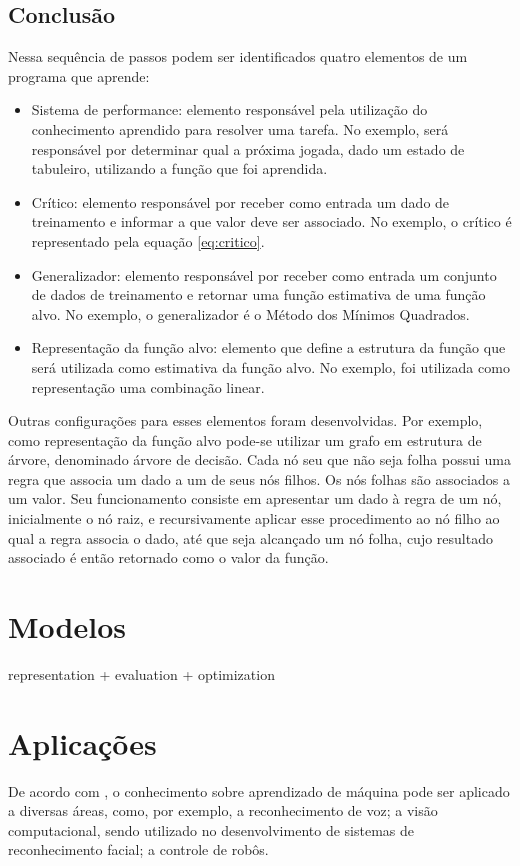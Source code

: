
\subsection*{Conclusão}

Nessa sequência de passos podem ser identificados quatro elementos de um programa que aprende:

\begin{itemize}
\item Sistema de performance: elemento responsável pela utilização do conhecimento aprendido para resolver uma tarefa. No exemplo, será responsável por determinar qual a próxima jogada, dado um estado de tabuleiro, utilizando a função que foi aprendida. 
\item Crítico: elemento responsável por receber como entrada um dado de treinamento e informar a que valor deve ser associado. No exemplo, o crítico é representado pela equação \ref{eq:critico}.
\item Generalizador: elemento responsável por receber como entrada um conjunto de dados de treinamento e retornar uma função estimativa de uma função alvo. No exemplo, o generalizador é o Método dos Mínimos Quadrados.
\item Representação da função alvo: elemento que define a estrutura da função que será utilizada como estimativa da função alvo. No exemplo, foi utilizada como representação uma combinação linear.
\end{itemize}

Outras configurações para esses elementos foram desenvolvidas. Por exemplo, como representação da função alvo pode-se utilizar um grafo em estrutura de árvore, denominado árvore de decisão. Cada nó seu que não seja folha possui uma regra que associa um dado a um de seus nós filhos. Os nós folhas são associados a um valor. Seu funcionamento consiste em apresentar um dado à regra de um nó, inicialmente o nó raiz, e recursivamente aplicar esse procedimento ao nó filho ao qual a regra associa o dado, até que seja alcançado um nó folha, cujo resultado associado é então retornado como o valor da função.

\section{Modelos}
representation + evaluation + optimization \cite{ML_know}

\section{Aplicações}

De acordo com \cite{Mitchell_discipline}, o conhecimento sobre aprendizado de máquina pode ser aplicado a diversas áreas, como, por exemplo, a reconhecimento de voz; a visão computacional, sendo utilizado no desenvolvimento de sistemas de reconhecimento facial; a controle de robôs.